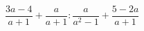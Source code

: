 \begin{ex}[type=expression]
	\begin{condition}
		\(\dfrac{3a-4}{a+1}+\dfrac{a}{a+1}:\dfrac{a}{a^2-1}+\dfrac{5-2a}{a+1}\)
	\end{condition}
\end{ex}